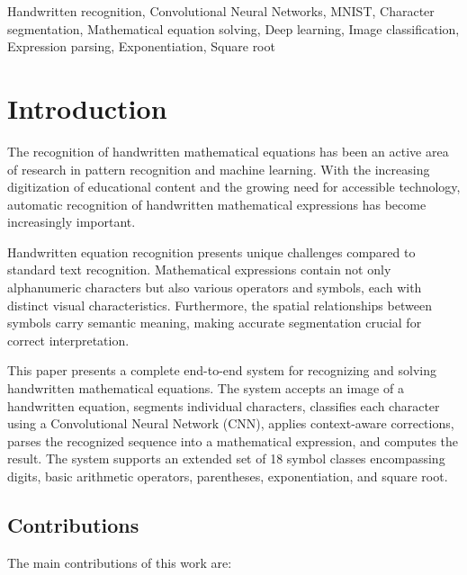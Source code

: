 \documentclass[conference]{IEEEtran}
\begin{document}
\begin{IEEEkeywords}
Handwritten recognition, Convolutional Neural Networks, MNIST, Character segmentation, Mathematical equation solving, Deep learning, Image classification, Expression parsing, Exponentiation, Square root
\end{IEEEkeywords}

\section{Introduction}

The recognition of handwritten mathematical equations has been an active area of research in pattern recognition and machine learning. With the increasing digitization of educational content and the growing need for accessible technology, automatic recognition of handwritten mathematical expressions has become increasingly important.

Handwritten equation recognition presents unique challenges compared to standard text recognition. Mathematical expressions contain not only alphanumeric characters but also various operators and symbols, each with distinct visual characteristics. Furthermore, the spatial relationships between symbols carry semantic meaning, making accurate segmentation crucial for correct interpretation.

This paper presents a complete end-to-end system for recognizing and solving handwritten mathematical equations. The system accepts an image of a handwritten equation, segments individual characters, classifies each character using a Convolutional Neural Network (CNN), applies context-aware corrections, parses the recognized sequence into a mathematical expression, and computes the result. The system supports an extended set of 18 symbol classes encompassing digits, basic arithmetic operators, parentheses, exponentiation, and square root.

\subsection{Contributions}

The main contributions of this work are:
\end{document}
